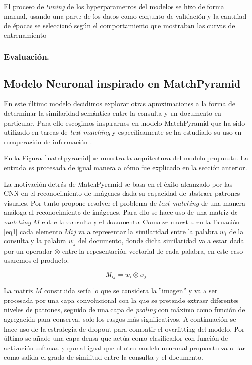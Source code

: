 \documentclass{llncs}
\begin{document}
El proceso de \textit{tuning} de los hyperparametros del modelos se hizo de forma manual, usando una parte de los datos como conjunto de validación y la cantidad de épocas se seleccionó según el comportamiento que mostraban las curvas de entrenamiento.

\subsubsection{Evaluación.}

\subsection{Modelo Neuronal inspirado en MatchPyramid}

 En este último modelo decidimos explorar otras aproximaciones a la forma de determinar la similaridad semántica entre la consulta y un documento en particular. Para ello escogimos inspirarnos en modelo MatchPyramid \cite{193} que ha sido utilizado en tareas de \textit{text matching} y específicamente se ha estudiado su uso en recuperación de información \cite{194}. 
 
  En la Figura \ref{matchpyramid} se muestra la arquitectura del modelo propuesto. La entrada es procesada de igual manera a cómo fue explicado en la sección anterior.
  
La motivación detrás de MatchPyramid se basa en el éxito alcanzado por las CNN en el reconocimiento de imágenes dada su capacidad de abstraer patrones visuales. Por tanto propone resolver el problema de \textit{text matching} de una manera análoga al reconocimiento de imágenes. Para ello se hace uso de una matriz de \textit{matching} $M$ entre la consulta y el documento. Como se muestra en la Ecuación \ref{eq1} cada elemento $M{ij}$ va a representar la similaridad entre la palabra $w_i$ de la consulta y la palabra $w_j$ del documento, donde dicha similaridad va a estar dada por un operador $\otimes$ entre la repesentación vectorial de cada palabra, en este caso usaremos el producto. 

 \begin{equation}
 \label{eq1}
 M_{ij} = w_i \otimes w_j
 \end{equation} 
  
 La matriz $M$ construida sería lo que se considera la ''imagen'' y va a ser procesada por una capa convolucional con la que se pretende extraer diferentes niveles de patrones, seguido de una capa de \textit{pooling} con máximo como función de agregación para conservar solo los rasgos más significativos. A continuación se hace uso de la estrategia de dropout para combatir el overfitting del modelo. Por último se añade una capa densa que actúa como clasificador con función de activación softmax y que al igual que el otro modelo neuronal propuesto va a dar como salida el grado de similitud entre la consulta y el documento. 
\end{document}
